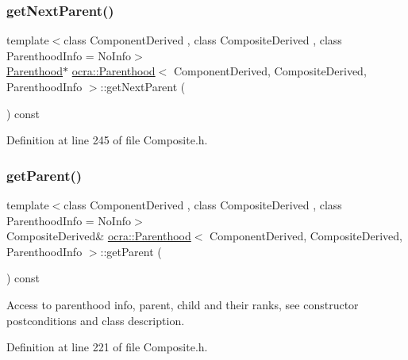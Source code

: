 \subsubsection{\texorpdfstring{get\+Next\+Parent()}{getNextParent()}}
{\footnotesize\ttfamily template$<$class Component\+Derived , class Composite\+Derived , class Parenthood\+Info  = No\+Info$>$ \\
\hyperlink{classocra_1_1Parenthood}{Parenthood}$\ast$ \hyperlink{classocra_1_1Parenthood}{ocra\+::\+Parenthood}$<$ Component\+Derived, Composite\+Derived, Parenthood\+Info $>$\+::get\+Next\+Parent (\begin{DoxyParamCaption}{ }\end{DoxyParamCaption}) const\hspace{0.3cm}{\ttfamily [inline]}}



Definition at line 245 of file Composite.\+h.

\hypertarget{classocra_1_1Parenthood_ac7e617fc08d7bed72fc6f90579b5cef7}{}\label{classocra_1_1Parenthood_ac7e617fc08d7bed72fc6f90579b5cef7} 
\subsubsection{\texorpdfstring{get\+Parent()}{getParent()}}
{\footnotesize\ttfamily template$<$class Component\+Derived , class Composite\+Derived , class Parenthood\+Info  = No\+Info$>$ \\
Composite\+Derived\& \hyperlink{classocra_1_1Parenthood}{ocra\+::\+Parenthood}$<$ Component\+Derived, Composite\+Derived, Parenthood\+Info $>$\+::get\+Parent (\begin{DoxyParamCaption}{ }\end{DoxyParamCaption}) const\hspace{0.3cm}{\ttfamily [inline]}}



Access to parenthood info, parent, child and their ranks, see constructor postconditions and class description. 



Definition at line 221 of file Composite.\+h.

\hypertarget{classocra_1_1Parenthood_a701292fd986632d0ec5c54f783db04ea}{}\label{classocra_1_1Parenthood_a701292fd986632d0ec5c54f783db04ea} 
